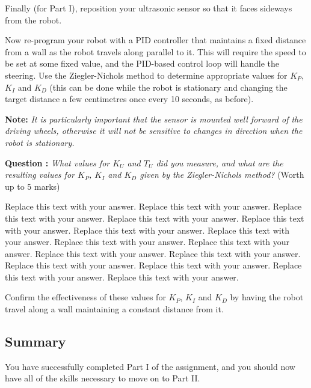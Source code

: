 \documentclass[hidelinks,a4paper,11pt]{article}
\newcounter{question}
\newcommand\myq{\refstepcounter{question}\thequestion}
\begin{document}
Finally (for Part I), reposition your ultrasonic sensor so that it faces sideways from the robot.

Now re-program your robot with a PID controller that maintains a fixed distance from a wall as the robot travels along parallel to it.  This will require the speed to be set at some fixed value, and the PID-based control loop will handle the steering.  Use the Ziegler-Nichols method to determine appropriate values for $K_P$, $K_I$ and $K_D$ (this can be done while the robot is stationary and changing the target distance a few centimetres once every 10 seconds, as before).

{\bfseries Note:}  \emph{It is particularly important that the sensor is mounted well forward of the driving wheels, otherwise it will not be sensitive to changes in direction when the robot is stationary.}

{\bfseries Question \myq:}  \emph{What values for $K_U$ and $T_U$ did you measure, and what are the resulting values for $K_P$, $K_I$ and $K_D$  given by the Ziegler-Nichols method?} (Worth up to 5 marks)\\
\begin{mdframed}
Replace this text with your answer.  Replace this text with your answer.  Replace this text with your answer.  Replace this text with your answer.  Replace this text with your answer.  Replace this text with your answer.  Replace this text with your answer.  Replace this text with your answer.  Replace this text with your answer.  Replace this text with your answer.  Replace this text with your answer.  Replace this text with your answer.  Replace this text with your answer.  Replace this text with your answer.  Replace this text with your answer.
\end{mdframed}
\vspace*{\baselineskip}

\begin{todolist}
	\item Confirm the effectiveness of these values for $K_P$, $K_I$ and $K_D$ by having the robot travel along a wall maintaining a constant distance from it.
 \end{todolist}


\subsection{Summary}

You have successfully completed Part I of the assignment, and you should now have all of the skills necessary to move on to Part II.
\end{document}
